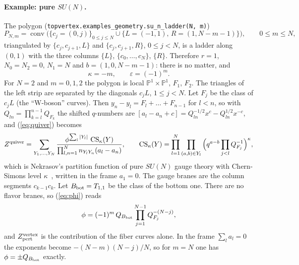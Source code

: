 \documentclass[11pt]{article}
\theoremstyle{plain}
\theoremstyle{definition}
\theoremstyle{remark}
\newcommand{\PP}{\mathbb{P}}
\begin{document}
\paragraph{Example: pure $SU(N)$.} The polygon
(\texttt{topvertex.examples\_geometry.su\_n\_ladder(N, m)})
\begin{equation}
P_{N,m}=\operatorname{conv}\big(\{c_j=(0,j)\}_{0\le j\le N}\cup\{L=(-1,1),\,R=(1,N-m-1)\}\big),\qquad 0\le m\le N,
\end{equation}
triangulated by $\{c_j,c_{j+1},L\}$ and $\{c_j,c_{j+1},R\}$, $0\le j<N$, is a ladder along
$(0,1)$ with the three columns $\{L\}$, $\{c_0,\ldots,c_N\}$, $\{R\}$. Therefore $r=1$, $N_0=N_2=0$,
$N_1=N$ and $b=(1,0,N-m-1)$: there is no matter, and
\begin{equation}
\kappa=-m,\qquad\varepsilon=(-1)^m .
\end{equation}
For $N=2$ and $m=0,1,2$ the polygon is local $\PP^1\times\PP^1$, $F_1$, $F_2$. The triangles of
the left strip are separated by the diagonals $c_jL$, $1\le j<N$. Let $F_j$ be the class of
$c_jL$ (the ``W-boson'' curves). Then $y_n-y_l=F_l+\ldots+F_{n-1}$ for $l<n$, so with
$Q_{ln}=\prod_{k=l}^{n-1}Q_{F_k}$ the shifted $q$-numbers are
$[a_l-a_n+c]=Q_{ln}^{-1/2}x^c-Q_{ln}^{1/2}x^{-c}$, and (\ref{eq:quiver}) becomes
\begin{equation}\label{eq:nek}
Z^{\rm quiver}=\sum_{Y_1,\ldots,Y_N}\frac{\phi^{\sum_l|Y_l|}\ \mathrm{CS}_\kappa(Y)}{\prod_{l,n=1}^Nn_{Y_lY_n}(a_l-a_n)},
\qquad
\mathrm{CS}_\kappa(Y)=\prod_{l=1}^N\prod_{(a,b)\in Y_l}\Big(q^{a-b}\prod_{j<l}Q_{F_j}^{-1}\Big)^{\kappa},
\end{equation}
which is Nekrasov's partition function of pure $SU(N)$ gauge theory with Chern-Simons level
$\kappa$~\cite{Nekrasov,IKP-SUN}, written in the frame $a_1=0$. The gauge branes are the column
segments $c_{k-1}c_k$. Let $B_{\rm bot}=T_{1,1}$ be the class of the bottom one. There are no
flavor branes, so (\ref{eq:phi}) reads
\begin{equation}
\phi=(-1)^m\,Q_{B_{\rm bot}}\prod_{j=1}^{N-1}Q_{F_j}^{-(N-j)},
\end{equation}
and $Z^{\rm vertex}_{\rm pert}$ is the contribution of the fiber curves alone. In the frame
$\sum_la_l=0$ the exponents become $-(N-m)(N-j)/N$, so for $m=N$ one has
$\phi=\pm Q_{B_{\rm bot}}$ exactly.
\end{document}

